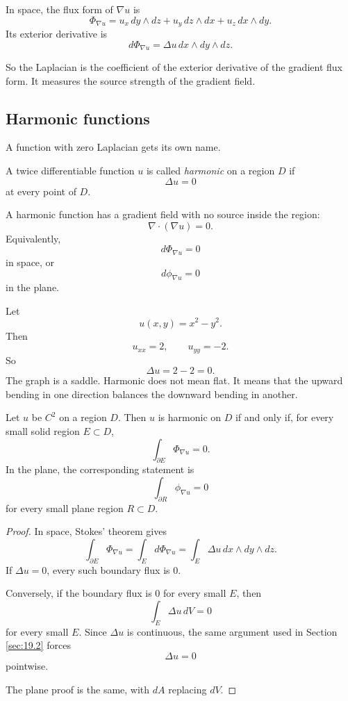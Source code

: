 In space, the flux form of \(\nabla u\) is
\[
\boxed{
    \Phi_{\nabla u}
    =
    u_x\,dy\wedge dz
    +
    u_y\,dz\wedge dx
    +
    u_z\,dx\wedge dy.
}
\]
Its exterior derivative is
\[
\boxed{
    d\Phi_{\nabla u}
    =
    \Delta u\,dx\wedge dy\wedge dz.
}
\]

So the Laplacian is the coefficient of the exterior derivative of the gradient flux form.
It measures the source strength of the gradient field.

\subsection{Harmonic functions}

A function with zero Laplacian gets its own name.

\begin{definition}
A twice differentiable function \(u\) is called \emph{harmonic} on a region \(D\) if
\[
\boxed{
    \Delta u=0
}
\]
at every point of \(D\).
\end{definition}

A harmonic function has a gradient field with no source inside the region:
\[
    \nabla\cdot(\nabla u)=0.
\]
Equivalently,
\[
    d\Phi_{\nabla u}=0
\]
in space, or
\[
    d\phi_{\nabla u}=0
\]
in the plane.

\begin{example}
Let
\[
    u(x,y)=x^2-y^2.
\]
Then
\[
    u_{xx}=2,
    \qquad
    u_{yy}=-2.
\]
So
\[
    \Delta u=2-2=0.
\]
The graph is a saddle.  Harmonic does not mean flat.  It means that the upward bending
in one direction balances the downward bending in another.
\end{example}

\begin{theorem}
Let \(u\) be \(C^2\) on a region \(D\).  Then \(u\) is harmonic on \(D\) if and only if,
for every small solid region \(E\subset D\),
\[
\boxed{
    \int_{\partial E}\Phi_{\nabla u}=0.
}
\]
In the plane, the corresponding statement is
\[
\boxed{
    \int_{\partial R}\phi_{\nabla u}=0
}
\]
for every small plane region \(R\subset D\).
\end{theorem}

\begin{proof}
In space, Stokes' theorem gives
\[
    \int_{\partial E}\Phi_{\nabla u}
    =
    \int_E d\Phi_{\nabla u}
    =
    \int_E \Delta u\,dx\wedge dy\wedge dz.
\]
If \(\Delta u=0\), every such boundary flux is \(0\).

Conversely, if the boundary flux is \(0\) for every small \(E\), then
\[
    \int_E \Delta u\,dV=0
\]
for every small \(E\).  Since \(\Delta u\) is continuous, the same argument used in
Section \ref{sec:19.2} forces
\[
    \Delta u=0
\]
pointwise.

The plane proof is the same, with \(dA\) replacing \(dV\).
\end{proof}

